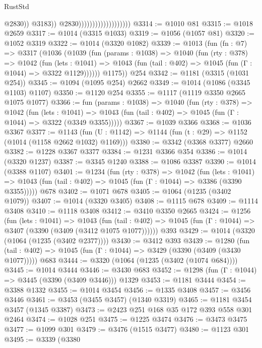 \begin{lexlean}{RustStd}
\begin{coremodule}
                                                  @2830))
                                              @3183))
                                          @2830)))))))))))))))))))
@3314 := @1010 @81
@3315 := @1018 @2659
@3317 := @1014 (@3315 @1033)
@3319 := @1056 (@1057 @81)
@3320 := @1052 @3319
@3322 := @1014 (@3320 @1082)
@3339 := @1013
    (fun (fn : @7) =>
    @3317
      (@1036
        (@1039
          (fun (params : @1038) =>
          @1040
            (fun (rty : @378) =>
            @1042
              (fun (lets : @1041) =>
              @1043 (fun (tail : @402) => @1045 (fun (Γ : @1044) => @3322 @1129))))))
        @1175))
    @254
@3342 := @1181 (@3315 (@1031 @254))
@3345 := @1094 (@1095 @254) @2662
@3349 := @1014 (@1086 (@3345 @1103) @1107)
@3350 := @1120 @254
@3355 := @1117 (@1119 @3350 @2665 @1075 @1077)
@3366 := fun (params : @1038) =>
  @1040
    (fun (rty : @378) =>
    @1042
      (fun (lets : @1041) =>
      @1043 (fun (tail : @402) => @1045 (fun (Γ : @1044) => @3322 (@3349 @3355)))))
@3367 := @1039 @3366
@3368 := @1036 @3367
@3377 := @1143 (fun (U : @1142) => @1144 (fun (t : @29) => @1152 (@1014 (@1158 @2662 @1032) @1169)))
@3380 := @3342 (@3368 @3377) @2660
@3382 := @1228 @3367 @3377
@3384 := @1231 @3366 @354
@3386 := @1014 (@3320 @1237)
@3387 := @3345 @1240
@3388 := @1086 @3387
@3390 := @1014 (@3388 @1107)
@3401 := @1234
    (fun (rty : @378) =>
    @1042
      (fun (lets : @1041) =>
      @1043 (fun (tail : @402) => @1045 (fun (Γ : @1044) => @3386 (@3390 @3355)))))
    @678
@3402 := @1071 @678
@3405 := @1064 (@1235 (@3402 @1079))
@3407 := @1014 (@3320 @3405)
@3408 := @1115 @678
@3409 := @1114 @3408
@3410 := @1118 @3408
@3412 := @3410 @3350 @2665
@3424 := @1256
    (fun (lets : @1041) =>
    @1043
      (fun (tail : @402) => @1045 (fun (Γ : @1044) => @3407 (@3390 (@3409 (@3412 @1075 @1077))))))
    @393
@3429 := @1014 (@3320 (@1064 (@1235 (@3402 @2377))))
@3430 := @3412 @393
@3439 := @1280
    (fun (tail : @402) => @1045 (fun (Γ : @1044) => @3429 (@3390 (@3409 (@3430 @1077)))))
    @683
@3444 := @3320 (@1064 (@1235 (@3402 (@1074 @684))))
@3445 := @1014 @3444
@3446 := @3430 @683
@3452 := @1298 (fun (Γ : @1044) => @3445 (@3390 (@3409 @3446))) @1329
@3453 := @1181 @3444
@3454 := @3388 @1332
@3455 := @1014 @3454
@3456 := @1335 @3408
@3457 := @3456 @3446
@3461 := @3453 (@3455 @3457) (@1340 @3319)
@3465 := @1181 @3454 @3457 (@1345 @3387)
@3473 := @2423 @251 @168 @35 @172 @393 @558 @301 @2464
@3474 := @1028 @251
@3475 := @1225 @3474
@3476 := @3473 @3475
@3477 := @1099 @301
@3479 := @3476 (@1515 @3477)
@3480 := @1123 @301
@3495 := @3339
    (@3380

\end{coremodule}
\end{lexlean}
